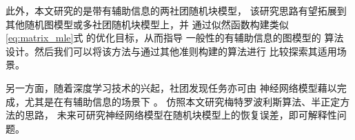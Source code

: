此外，本文研究的是带有辅助信息的两社团随机块模型，
该研究思路有望拓展到其他随机图模型或多社团随机块模型上，并
通过似然函数构建类似\eqref{eq:matrix_mle}式
的优化目标，从而指导
一般性的有辅助信息的图模型的
算法设计。然后我们可以将该方法与通过其他准则\cite{chunaev2020community}构建的算法进行
比较探索其适用场景。

另一方面，随着深度学习技术的兴起，社团发现任务亦可由
神经网络模型藉以完成，尤其是在有辅助信息的场景下 \cite{cao2018incorporating}。
仿照本文研究梅特罗波利斯算法、半正定方法的思路，
未来可研究神经网络模型在随机块模型上的恢复误差，即可解释性问题。